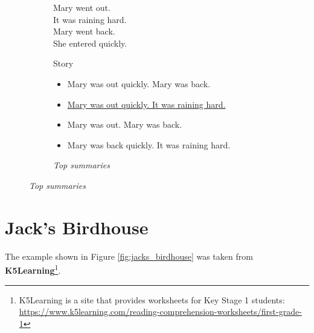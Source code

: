 \begin{figure}[H]
\begin{subfigure}{0.4\textwidth}
\begin{displayquote}
Mary went out.\\
It was raining hard.\\
Mary went back.\\
She entered quickly.
\end{displayquote}
\caption{Story}
\end{subfigure}
\begin{subfigure}{0.6\textwidth}
\begin{itemize}[nolistsep]
\item Mary was out quickly. Mary was back.
\item \ul{Mary was out quickly. It was raining hard.}
\item Mary was out. Mary was back.
\item Mary was back quickly. It was raining hard.
\end{itemize}
\vspace{\topsep}
\caption{\textit{Top summaries}}
\end{subfigure}
\end{figure}

\section*{Jack's Birdhouse}

The example shown in Figure \ref{fig:jacks_birdhouse} was taken from \textbf{K5Learning}\footnote{K5Learning is a site that provides worksheets for Key Stage 1 students: \url{https://www.k5learning.com/reading-comprehension-worksheets/first-grade-1}}.

